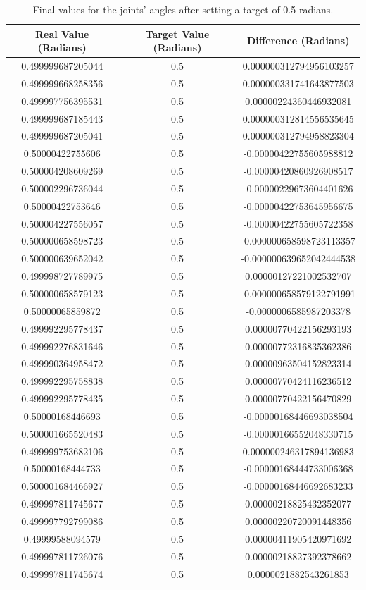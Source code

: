 \documentclass[12pt,oneside]{article}
\begin{document}
\begin{table}[H]
\centering
\begin{tabular}{c|c|c}
\hline
Real Value (Radians) & Target Value (Radians) & Difference (Radians) \\
\hline
0.499999687205044 & 0.5 & 0.000000312794956103257 \\
0.499999668258356 & 0.5 & 0.000000331741643877503 \\
0.499997756395531 & 0.5 & 0.00000224360446932081 \\
0.499999687185443 & 0.5 & 0.000000312814556535645 \\
0.499999687205041 & 0.5 & 0.000000312794958823304 \\
0.50000422755606 & 0.5 & -0.00000422755605988812 \\
0.500004208609269 & 0.5 & -0.00000420860926908517 \\
0.500002296736044 & 0.5 & -0.00000229673604401626 \\
0.50000422753646 & 0.5 & -0.00000422753645956675 \\
0.500004227556057 & 0.5 & -0.00000422755605722358 \\
0.500000658598723 & 0.5 & -0.000000658598723113357 \\
0.500000639652042 & 0.5 & -0.000000639652042444538 \\
0.499998727789975 & 0.5 & 0.00000127221002532707 \\
0.500000658579123 & 0.5 & -0.000000658579122791991 \\
0.50000065859872 & 0.5 & -0.0000006585987203378 \\
0.499992295778437 & 0.5 & 0.00000770422156293193 \\
0.499992276831646 & 0.5 & 0.00000772316835362386 \\
0.499990364958472 & 0.5 & 0.00000963504152823314 \\
0.499992295758838 & 0.5 & 0.00000770424116236512 \\
0.499992295778435 & 0.5 & 0.00000770422156470829 \\
0.50000168446693 & 0.5 & -0.00000168446693038504 \\
0.500001665520483 & 0.5 & -0.00000166552048330715 \\
0.499999753682106 & 0.5 & 0.000000246317894136983 \\
0.50000168444733 & 0.5 & -0.00000168444733006368 \\
0.500001684466927 & 0.5 & -0.00000168446692683233 \\
0.499997811745677 & 0.5 & 0.00000218825432352077 \\
0.499997792799086 & 0.5 & 0.00000220720091448356 \\
0.49999588094579 & 0.5 & 0.00000411905420971692 \\
0.499997811726076 & 0.5 & 0.00000218827392378662 \\
0.499997811745674 & 0.5 & 0.0000021882543261853 \\
\hline
\end{tabular}
\caption{Final values for the joints' angles after setting a target of 0.5 radians.}
\label{table:final-angles}
\end{table}
\end{document}

